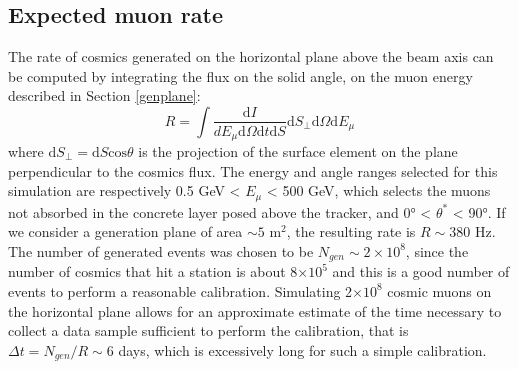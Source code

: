 \subsection{Expected muon rate}\label{ratetracker}
The rate of cosmics generated on the horizontal 
plane above the beam axis can be computed by 
integrating the flux on the solid angle, on 
the muon energy described in Section \ref{genplane}:
\begin{equation}
   R= \int \frac{\text{d} I}{d E_\mu \text{d} \Omega \text{d} t \text{d} S} \text{d} S_{\perp} \text{d} \Omega \text{d} E_\mu
    \end{equation}
where $\text{d}S_\perp= \text{d}S \text{cos}\theta$ 
is the projection of the surface element on the 
plane perpendicular to the cosmics flux. 
The energy and angle ranges selected for this 
simulation are respectively 0.5 GeV < $E_\mu$ < 500 GeV, 
which selects the muons not absorbed in the 
concrete layer posed above the tracker, 
and 0° < $\theta^*$ < 90°. 
If we consider a generation plane of area  
$\sim 5$ m$^2$, the resulting rate is $R \sim 380$ Hz. 
The number of generated events 
was chosen to be $N_{gen}\sim 2\times 10^8$, since the 
number of cosmics that 
hit a station is about 8$\times 10^5$ and 
this is a good number of events to perform 
a reasonable calibration.
Simulating 2$\times 10^8$ cosmic 
muons on the horizontal plane allows for an 
approximate estimate of the time necessary to 
collect a data sample sufficient to perform the 
calibration, that is
$\Delta t = N_{gen}/R\sim 6$ days, which is 
excessively long 
for such a simple calibration. 

